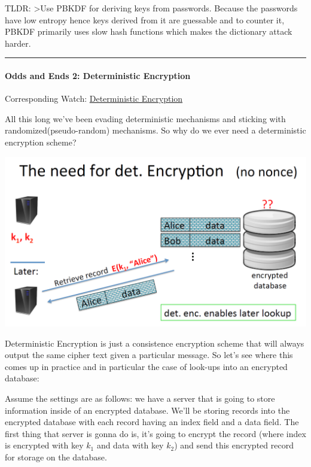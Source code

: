 \documentclass[11pt]{article}
\makeatletter
\def\maxwidth{\ifdim\Gin@nat@width>\linewidth\linewidth
    \else\Gin@nat@width\fi}
\let\Oldincludegraphics\includegraphics
\renewcommand{\includegraphics}[1]{\Oldincludegraphics[width=.8\maxwidth]{#1}}
\makeatother
\begin{document}
TLDR: \textgreater{}Use PBKDF for deriving keys from passwords. Because
the passwords have low entropy hence keys derived from it are guessable
and to counter it, PBKDF primarily uses slow hash functions which makes
the dictionary attack harder.

\begin{center}\rule{0.5\linewidth}{\linethickness}\end{center}

\hypertarget{odds-and-ends-2-deterministic-encryption}{%
\paragraph{Odds and Ends 2: Deterministic
Encryption}\label{odds-and-ends-2-deterministic-encryption}}

Corresponding Watch:
\href{https://www.coursera.org/learn/crypto/lecture/8oHZd/deterministic-encryption}{Deterministic
Encryption}

All this long we've been evading deterministic mechanisms and sticking
with randomized(pseudo-random) mechanisms. So why do we ever need a
deterministic encryption scheme?

\includegraphics{./Images/Need4DetEncryp.png}

Deterministic Encryption is just a consistence encryption scheme that
will always output the same cipher text given a particular message. So
let's see where this comes up in practice and in particular the case of
look-ups into an encrypted database:

Assume the settings are as follows: we have a server that is going to
store information inside of an encrypted database. We'll be storing
records into the encrypted database with each record having an index
field and a data field. The first thing that server is gonna do is, it's
going to encrypt the record (where index is encrypted with key \(k_{1}\)
and data with key \(k_{2}\)) and send this encrypted record for storage
on the database.
\end{document}
